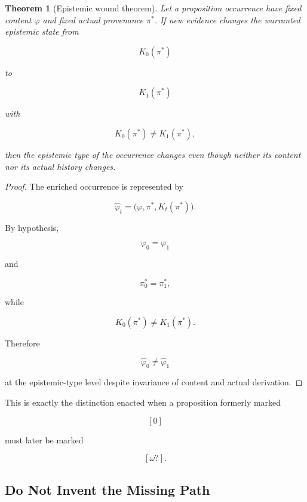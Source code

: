 \documentclass[
  11pt,
  a4paper,
  DIV=12,
  BCOR=0mm,
  parskip=half-
]{scrartcl}
\theoremstyle{definition}
\theoremstyle{plain}
\newtheorem{theorem}[definition]{Theorem}
\theoremstyle{remark}
\begin{document}
\begin{theorem}[Epistemic wound theorem]
\label{thm:epistemic-wound}
Let a proposition occurrence have fixed content \(\varphi\) and fixed actual
provenance \(\pi^\ast\). If new evidence changes the warranted epistemic state
from

\[
  K_0(\pi^\ast)
\]

to

\[
  K_1(\pi^\ast)
\]

with

\[
  K_0(\pi^\ast)\neq K_1(\pi^\ast),
\]

then the epistemic type of the occurrence changes even though neither its
content nor its actual history changes.
\end{theorem}

\begin{proof}
The enriched occurrence is represented by

\[
  \widehat\varphi_t
  =
  \bigl(
    \varphi,
    \pi^\ast,
    K_t(\pi^\ast)
  \bigr).
\]

By hypothesis,

\[
  \varphi_0=\varphi_1
\]

and

\[
  \pi^\ast_0=\pi^\ast_1,
\]

while

\[
  K_0(\pi^\ast)\neq K_1(\pi^\ast).
\]

Therefore

\[
  \widehat\varphi_0
  \neq
  \widehat\varphi_1
\]

at the epistemic-type level despite invariance of content and actual
derivation.
\end{proof}

This is exactly the distinction enacted when a proposition formerly marked

\[
  [0]
\]

must later be marked

\[
  [\omega?].
\]


\subsection{Do Not Invent the Missing Path}
\label{app:responsible-annotation}
\end{document}
